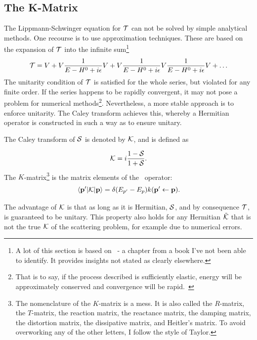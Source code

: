 \subsection{The K-Matrix}
    

The Lippmann-Schwinger equation for \(\mathcal{T}\) can not be solved by simple
analytical methods. One recourse is to use approximation techniques. These are
based on the expansion of \(\mathcal{T}\) into the 
infinite sum\footnote{A lot of this section is based
  on~\cite{reactance} - a chapter from a book I've not been able to identify. It
provides insights not stated as clearly elsewhere.}
\begin{equation*}
  \mathcal{T} = V + V \frac{1}{E-H^{0}+i\epsilon}V + V \frac{1}{E-H^{0}+i\epsilon}V \frac{1}{E-H^{0}+i\epsilon} V+\ldots
\end{equation*}
The unitarity condition of \(\mathcal{T}\) is satisfied for the whole series, but
violated for any finite order. If the series happens to be rapidly convergent,
it may not pose a problem for numerical methods\footnote{That is to say, if the
  process described is sufficiently elastic, energy will be approximately
  conserved and convergence will be rapid.~\cite{Le_Ru_2013}}. Nevertheless, a more stable
approach is to enforce unitarity. The Caley 
transform achieves this, whereby a Hermitian operator is constructed in such a way as to
ensure unitary.

The Caley transform of \(\mathcal{S}\) is denoted by \(\mathcal{K}\), and is defined
as

\begin{equation*}
  \mathcal{K} = i \frac{1-\mathcal{S}}{1+\mathcal{S}}.
\end{equation*}
The \(K\)-matrix\footnote{The nomenclature of the \(K\)-matrix is a mess. It is
  also called the \(R\)-matrix, the \(T\)-matrix, the reaction matrix, the
  reactance matrix, the damping matrix, the distortion matrix, the dissipative
  matrix, and Heitler's
  matrix. To avoid overworking any of the other
  letters, I follow the style of Taylor.} is the matrix elements of the\
 operator:
\begin{equation*}
  \mel{\vb{p}^{\prime}}{\mathcal{K}}{\vb{p}} = \delta(E_{p^{\prime}}-E_{p})k(\vb{p}^{\prime}\leftarrow\vb{p}).
\end{equation*}

The advantage of \(\mathcal{K}\) is that as long as it is Hermitian, \(\mathcal{S}\),
and by consequence \(\mathcal{T}\), is guaranteed to be unitary. This property also
holds for any Hermitian \(\tilde{\mathcal{K}}\) that is not the true \(\mathcal{K}\) of the
scattering problem, for example due to numerical errors\cite{laszlo,reactance}.


